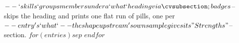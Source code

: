 $-- `skills` groups members under a `what` heading via \cvsubsection; badges
$-- skips the heading and prints one flat run of \cvtag pills, one per
$-- entry's `what` -- the shape upstream's own sample gives its "Strengths"
$-- section.
$for(entries)$$sep$ $endfor$
